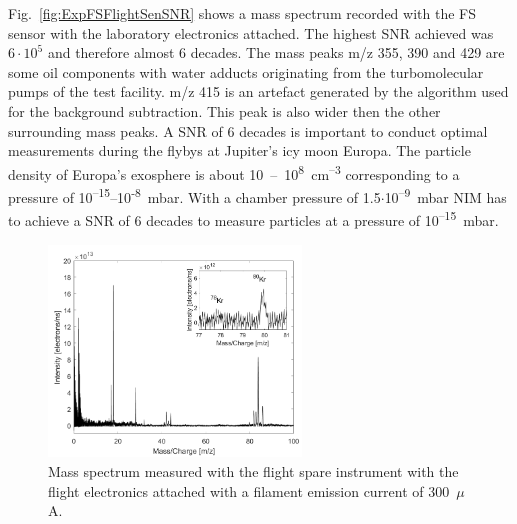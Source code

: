 		Fig.~\ref{fig:ExpFSFlightSenSNR} shows a mass spectrum recorded with the FS sensor with the laboratory electronics attached. The highest SNR achieved was $6\cdot10^{5}$ and therefore almost 6 decades. The mass peaks m/z 355, 390 and 429 are some oil components with water adducts originating from the turbomolecular pumps of the test facility. m/z 415 is an artefact generated by the algorithm used for the background subtraction. This peak is also wider then the other surrounding mass peaks.
		A SNR of 6 decades is important to conduct optimal measurements during the flybys at Jupiter's icy moon Europa. The particle density of Europa's exosphere is about 10~--~10\textsuperscript{8}~cm\textsuperscript{--3} \cite{Vorburger_2018} corresponding to a pressure of 10\textsuperscript{--15}--10\textsuperscript{-8}~mbar. With a chamber pressure of 1.5$\cdot$10\textsuperscript{--9}~mbar NIM has to achieve a SNR of 6 decades to measure particles at a pressure of 10\textsuperscript{--15}~mbar.\\
		
		\begin{figure} %
			\centering
			\includegraphics[width = 0.6\textwidth]{Experiments/FS_thMode300uA.png}
			\caption{Mass spectrum measured with the flight spare instrument with the flight electronics attached with a filament emission current of 300~$\mu$A.}
			\label{fig:ExpFSFlightElK78}
		\end{figure}
		
